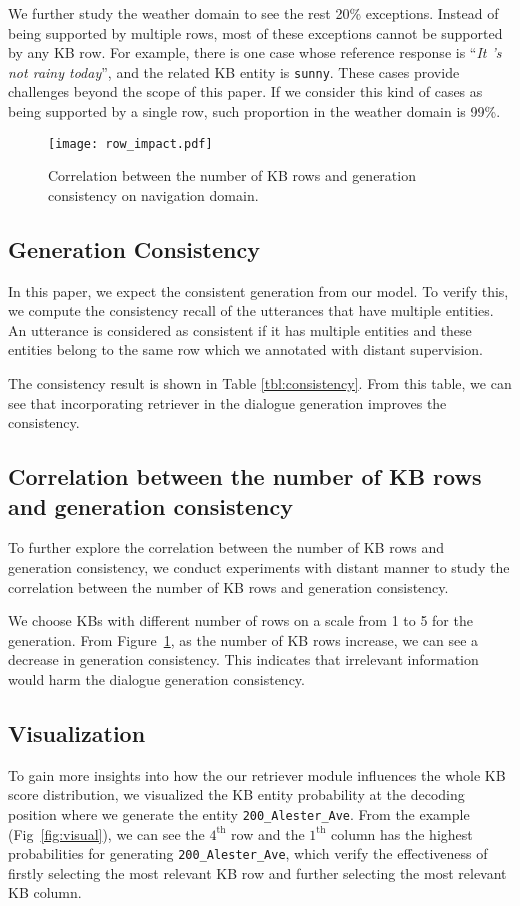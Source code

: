 \documentclass[11pt,a4paper]{article}
\begin{document}
 We further study the weather domain
 to see the rest 20\% exceptions.
 Instead of being supported by multiple rows,
 most of these exceptions cannot be supported by any KB row.
 For example, there is one case whose reference response is ``\textit{It 's not rainy today}'',
 and the related KB entity is \texttt{sunny}.
 These cases provide challenges beyond the scope of this paper.
 If we consider this kind of cases as being supported by a single row,
 such proportion in the weather domain is 99\%.


\begin{figure}[t!]
	\centering
	\texttt{[image: row\_impact.pdf]}
	\caption{Correlation between the number of KB rows and generation consistency on navigation domain.}\label{fig:row_num}
\end{figure}


\subsection{{Generation Consistency}}
In this paper,
we expect the consistent generation
from our model.
To verify this, we compute the consistency recall
of the utterances that have multiple entities.
An utterance is considered as consistent
if it has multiple entities and these entities belong to the same row which we annotated with distant supervision.

The consistency result is shown in Table \ref{tbl:consistency}.
From this table, we can see that incorporating retriever
in the dialogue generation improves the consistency.

\subsection{{Correlation between the number of KB rows and generation consistency}}
To further explore the correlation between the number of KB rows and generation consistency,
we conduct experiments with distant manner to  study the correlation between the number of KB rows and generation consistency.

We choose KBs with different number of rows on a scale from 1 to 5  for the generation.
From Figure~\ref{fig:row_num}, as the number of KB rows increase, 
we can see a decrease in generation consistency.
This indicates that irrelevant information would harm the dialogue generation consistency.


 	\subsection{Visualization}
To gain more insights into how the our retriever module influences the whole KB score distribution, we visualized the KB entity probability at the decoding position where we generate the entity \texttt{200\_Alester\_Ave}.
From the example (Fig~\ref{fig:visual}), we can see the $4^\text{th}$ row and the $1^\text{th}$ column has the highest probabilities for generating \texttt{200\_Alester\_Ave}, 
which verify the effectiveness of  firstly selecting the most relevant KB row and further selecting
the most relevant KB column.
\end{document}
